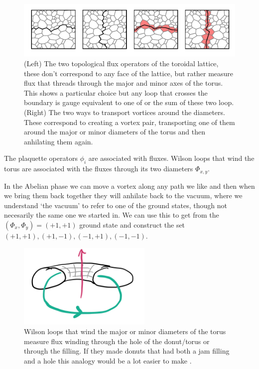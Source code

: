 \begin{figure}
\hypertarget{fig:loops_and_dual_loops}{%
\centering
\includegraphics[width=1.14\textwidth,height=\textheight]{figure_code/amk_chapter/loops_and_dual_loops/loops_and_dual_loops.pdf}
\caption{(Left) The two topological flux operators of the toroidal
lattice, these don't correspond to any face of the lattice, but rather
measure flux that threads through the major and minor axes of the torus.
This shows a particular choice but any loop that crosses the boundary is
gauge equivalent to one of or the sum of these two loop. (Right) The two
ways to transport vortices around the diameters. These correspond to
creating a vortex pair, transporting one of them around the major or
minor diameters of the torus and then anhilating them
again.}\label{fig:loops_and_dual_loops}
}
\end{figure}

The plaquette operators \(\phi_i\) are associated with fluxes. Wilson
loops that wind the torus are associated with the fluxes through its two
diameters \(\mathcal{\Phi}_{x,y}\).

In the Abelian phase we can move a vortex along any path we like and
then when we bring them back together they will anhilate back to the
vacuum, where we understand `the vacuum' to refer to one of the ground
states, though not necesarily the same one we started in. We can use
this to get from the \((\Phi_x, \Phi_y) = (+1, +1)\) ground state and
construct the set \((+1, +1), (+1, -1), (-1, +1), (-1, -1)\).

\begin{figure}
\hypertarget{fig:topological_fluxes}{%
\centering
\includegraphics[width=0.57\textwidth,height=\textheight]{figure_code/amk_chapter/topological_fluxes.png}
\caption{Wilson loops that wind the major or minor diameters of the
torus measure flux winding through the hole of the donut/torus or
through the filling. If they made donuts that had both a jam filling and
a hole this analogy would be a lot easier to make
\textcite{parkerWhyDoesThis}.}\label{fig:topological_fluxes}
}
\end{figure}

